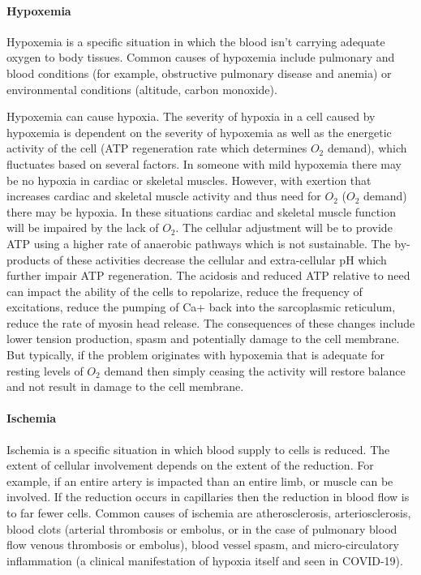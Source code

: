 \paragraph{Hypoxemia}
Hypoxemia is a specific situation in which the blood isn't carrying adequate oxygen to body tissues. Common causes of hypoxemia include pulmonary and blood conditions (for example, obstructive pulmonary disease and anemia) or environmental conditions (altitude, carbon monoxide). 

Hypoxemia can cause hypoxia. The severity of hypoxia in a cell caused by hypoxemia is dependent on the severity of hypoxemia as well as the energetic activity of the cell (ATP regeneration rate which determines $O_2$ demand), which fluctuates based on several factors. In someone with mild hypoxemia there may be no hypoxia in cardiac or skeletal muscles. However, with exertion that increases cardiac and skeletal muscle activity and thus need for $O_2$ ($O_2$ demand) there may be hypoxia. In these situations cardiac and skeletal muscle function will be impaired by the lack of $O_2$. The cellular adjustment will be to provide ATP using a higher rate of anaerobic pathways which is not sustainable. The by-products of these activities decrease the cellular and extra-cellular pH which further impair ATP regeneration. The acidosis and reduced ATP relative to need can impact the ability of the cells to repolarize, reduce the frequency of excitations, reduce the pumping of Ca+ back into the sarcoplasmic reticulum, reduce the rate of myosin head release. The consequences of these changes include lower tension production, spasm and potentially damage to the cell membrane. But typically, if the problem originates with hypoxemia that is adequate for resting levels of $O_2$ demand then simply ceasing the activity will restore balance and not result in damage to the cell membrane.
 
\paragraph{Ischemia}
Ischemia is a specific situation in which  blood supply to cells is reduced. The extent of cellular involvement depends on the extent of the reduction. For example, if an entire artery is impacted than an entire limb, or muscle can be involved. If the reduction occurs in capillaries then the reduction in blood flow is to far fewer cells. Common causes of ischemia are atherosclerosis, arteriosclerosis,\footnotemark{} blood clots (arterial thrombosis or embolus, or in the case of pulmonary blood flow venous thrombosis or embolus), blood vessel spasm, and micro-circulatory inflammation (a clinical manifestation of hypoxia itself and seen in COVID-19). 

